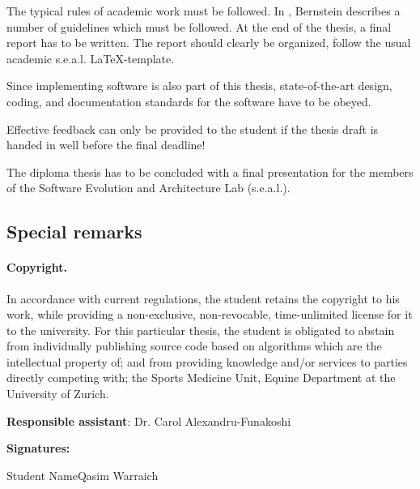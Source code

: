 \documentclass{task_description}
\begin{document}
The typical rules of academic work must be followed. In
\cite{Bernstein2005-daguide}, Bernstein describes a number of guidelines which
must be followed. At the end of the thesis, a final report has to be
written. The report should clearly be organized, follow the usual academic
s.e.a.l. \LaTeX-template.

Since implementing software is also part of this thesis, state-of-the-art
design, coding, and documentation standards for the software have to be obeyed.

Effective feedback can only be provided to the student if the thesis draft is handed in well before the final deadline!

The diploma thesis has to be concluded with a final presentation for the members
of the Software Evolution and Architecture Lab (s.e.a.l.).

\subsection*{Special remarks}
\paragraph{Copyright.}
In accordance with current regulations, the student retains the copyright to his work, while providing a non-exclusive, non-revocable, time-unlimited license for it to the university. For this particular thesis, the student is obligated to abstain from individually publishing source code based on algorithms which are the intellectual property of; and from providing knowledge and/or services to parties directly competing with; the Sports Medicine Unit, Equine Department at the University of Zurich.

\vspace{2em}
\noindent\textbf{Responsible assistant}: Dr. Carol Alexandru-Funakoshi

\vspace{2em}
\noindent\textbf{Signatures:}

\vspace{3\baselineskip}
\noindent Student Name\hfill Qasim Warraich
\vspace{2cm}


\end{document}
